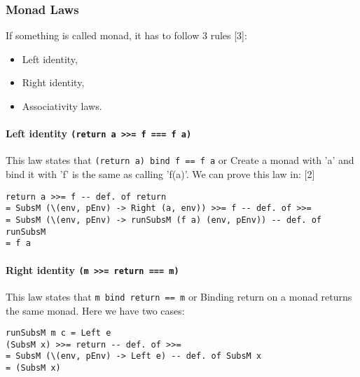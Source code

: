 \documentclass[11pt]{article}
\begin{document}
\subsubsection{Monad Laws}

If something is called monad, it has to follow 3 rules [3]:
\begin{itemize}
\item Left identity,	
\item Right identity,
\item Associativity laws.
\end{itemize}


\paragraph{Left identity \texttt{(return a >>= f  === f a)}}
This law states that \texttt{(return a) bind f == f a} or Create a monad with 'a' and bind it with 'f' is the same as calling 'f(a)'. We can prove this law in: [2]\\


\begin{verbatim}
return a >>= f -- def. of return
= SubsM (\(env, pEnv) -> Right (a, env)) >>= f -- def. of >>= 
= SubsM (\(env, pEnv) -> runSubsM (f a) (env, pEnv)) -- def. of runSubsM
= f a
\end{verbatim}


\paragraph{Right identity \texttt{(m >>= return === m)}}
This law states that \texttt{m bind return == m} or Binding return on a monad returns the same monad. Here we have two cases:\\
\begin{verbatim}
runSubsM m c = Left e
(SubsM x) >>= return -- def. of >>=
= SubsM (\(env, pEnv) -> Left e) -- def. of SubsM x
= (SubsM x) 
\end{verbatim}
\end{document}
